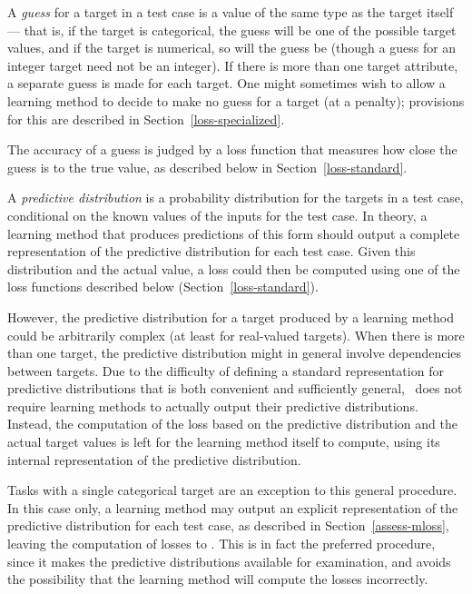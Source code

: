 A {\em guess\/} for a target in a test case is a value of the same
type as the target itself --- that is, if the target is categorical,
the guess will be one of the possible target values, and if the target
is numerical, so will the guess be (though a guess for an integer
target need not be an integer).  If there is more than one target
attribute, a separate guess is made for each target.  One might
sometimes wish to allow a learning method to decide to make no
guess for a target (at a penalty); provisions for this are described
in Section~\ref{loss-specialized}.

The accuracy of a guess is judged by a loss function that measures how
close the guess is to the true value, as described below in
Section~\ref{loss-standard}.

A {\em predictive distribution\/} is a probability distribution for
the targets in a test case, conditional on the known values of the
inputs for the test case.  In theory, a learning method that
produces predictions of this form should output a complete
representation of the predictive distribution for each test case.
Given this distribution and the actual value, a loss could then be
computed using one of the loss functions described below
(Section~\ref{loss-standard}).

However, the predictive distribution for a target produced by a
learning method could be arbitrarily complex (at least for real-valued
targets).  When there is more than one target, the predictive
distribution might in general involve dependencies between targets.
Due to the difficulty of defining a standard representation for
predictive distributions that is both convenient and sufficiently
general, \delve\ does not require learning methods to actually output
their predictive distributions.  Instead, the computation of the loss
based on the predictive distribution and the actual target values is
left for the learning method itself to compute, using its internal
representation of the predictive distribution.

Tasks with a single categorical target are an exception to this
general procedure.  In this case only, a learning method may output
an explicit representation of the predictive distribution for each
test case, as described in Section~\ref{assess-mloss}, leaving the
computation of losses to \delve.  This is in fact the preferred
procedure, since it makes the predictive distributions available for
examination, and avoids the possibility that the learning method
will compute the losses incorrectly.



